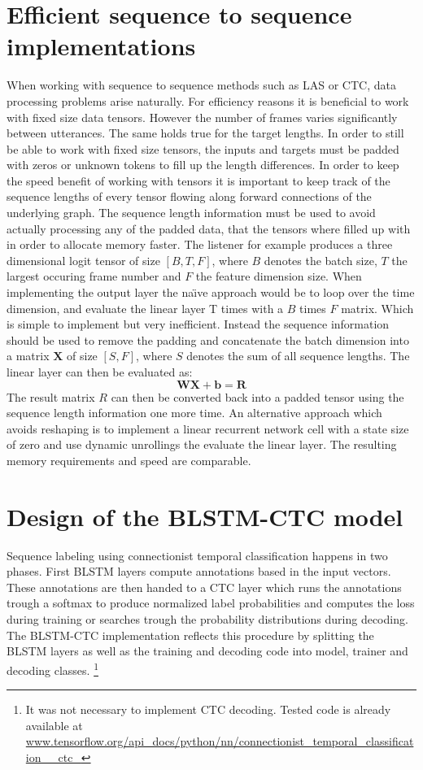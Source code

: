 \section{Efficient sequence to sequence implementations}
When working with sequence to sequence methods such as LAS or CTC, data processing problems arise naturally. For efficiency reasons it is beneficial to work with fixed size data tensors. However the number of frames varies significantly between utterances. The same holds true for the target lengths. In order to still be able to work with fixed size tensors, the inputs and targets must be padded with zeros or unknown tokens to fill up the length differences.
In order to keep the speed benefit of working with tensors it is important to
keep track of the sequence lengths of every tensor flowing along forward connections of the underlying graph.
The sequence length information must be used to avoid actually processing any of the padded data, that the tensors where filled up with in order to allocate memory faster.
The listener for example produces a three dimensional logit tensor of size $[B, T, F]$, where $B$ denotes the batch size, $T$ the largest occuring frame number and $F$ the feature dimension size. When implementing the output layer the na\"{\i}ve approach would be to loop over the time dimension, and evaluate the linear layer T times with a $B$ times $F$ matrix. Which is simple to implement but very inefficient. Instead the sequence information should be used to remove the padding and concatenate the batch dimension into a matrix $\mathbf{X}$ of size $[S, F]$, where $S$ denotes the sum of all sequence lengths. The linear layer can then be evaluated as:
\begin{equation}
\mathbf{W}\mathbf{X} + \mathbf{b} = \mathbf{R}
\end{equation}
The result matrix $R$ can then be converted back into a padded tensor using the sequence length information one more time.
An alternative approach which avoids reshaping is to implement a linear recurrent network cell with a state size of zero and use dynamic unrollings the evaluate the linear layer. The resulting memory requirements and speed are comparable.

\section{Design of the BLSTM-CTC model}
Sequence labeling using connectionist temporal classification happens in two phases. First BLSTM layers compute annotations based in the input vectors. These annotations are then handed to a CTC layer which runs the annotations trough a softmax to produce normalized label probabilities and computes the loss during training or searches trough the probability distributions during decoding. 
The BLSTM-CTC implementation reflects this procedure by splitting the BLSTM layers as well as the training and decoding code into model, trainer and decoding classes. \footnote{It was not necessary to implement CTC decoding. Tested code is already available at \url{www.tensorflow.org/api_docs/python/nn/connectionist\_temporal\_classification\_\_ctc\_}} 



